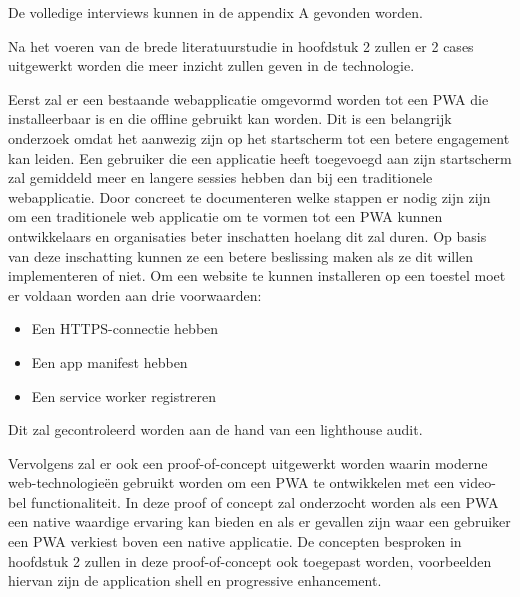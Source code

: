 De volledige interviews kunnen in de appendix A gevonden worden.

Na het voeren van de brede literatuurstudie in hoofdstuk 2 zullen er 2 cases uitgewerkt worden die meer inzicht zullen geven in de technologie.


Eerst zal er een bestaande webapplicatie omgevormd worden tot een PWA die installeerbaar is en die offline gebruikt kan worden.
Dit is een belangrijk onderzoek omdat het aanwezig zijn op het startscherm tot een betere engagement kan leiden. Een gebruiker die een applicatie heeft toegevoegd aan zijn startscherm zal gemiddeld meer en langere sessies hebben dan bij een traditionele webapplicatie.
\autocite{LePage2020b}
Door concreet te documenteren welke stappen er nodig zijn zijn om een traditionele web applicatie om te vormen tot een PWA kunnen ontwikkelaars en organisaties beter inschatten hoelang dit zal duren.
Op basis van deze inschatting kunnen ze een betere beslissing maken als ze dit willen implementeren of niet.
Om een website te kunnen installeren op een toestel moet er voldaan worden aan drie voorwaarden:
\begin{itemize}
	\item Een HTTPS-connectie hebben
	\item Een app manifest hebben
	\item Een service worker registreren
\end{itemize}
Dit zal gecontroleerd worden aan de hand van een lighthouse audit.
	

Vervolgens zal er ook een proof-of-concept uitgewerkt worden waarin moderne web-technologieën gebruikt worden om een PWA te ontwikkelen met een video-bel functionaliteit. In deze proof of concept zal onderzocht worden als een PWA een native waardige ervaring kan bieden en als er gevallen zijn waar een gebruiker een PWA verkiest boven een native applicatie. De concepten besproken in hoofdstuk 2 zullen in deze proof-of-concept ook toegepast worden, voorbeelden hiervan zijn de application shell en  progressive enhancement.


